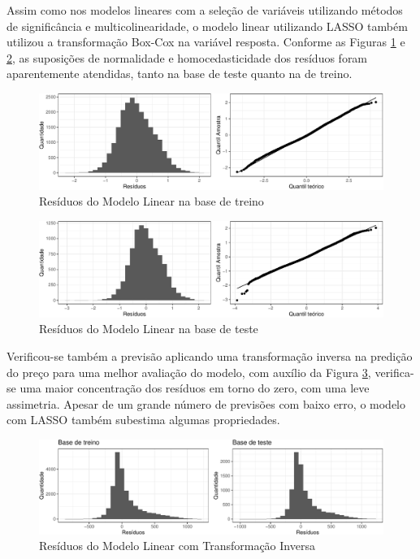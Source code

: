 \documentclass[
	12pt,				%
	a4paper,		%
	oneside,    %
	chapter=TITLE,		   %
	section=TITLE,		   %
	subsection=TITLE,	   %
	subsubsection=TITLE, %
	english,			%
	french,				%
	spanish,			%
	brazil,				%
]{abntex2}
\begin{document}
Assim como nos modelos lineares com a seleção de variáveis utilizando
métodos de significância e multicolinearidade, o modelo linear
utilizando LASSO também utilizou a transformação Box-Cox na variável
resposta. Conforme as Figuras \ref{resid_lasso} e
\ref{resid_lasso_test}, as suposições de normalidade e homocedasticidade
dos resíduos foram aparentemente atendidas, tanto na base de teste
quanto na de treino.

\begin{figure}
\centering
\includegraphics{00-TCC_files/figure-latex/resid_lasso-1.pdf}
\caption{\label{resid_lasso}Resíduos do Modelo Linear na base de treino}
\end{figure}

\begin{figure}
\centering
\includegraphics{00-TCC_files/figure-latex/resid_lasso_test-1.pdf}
\caption{\label{resid_lasso_test}Resíduos do Modelo Linear na base de
teste}
\end{figure}

Verificou-se também a previsão aplicando uma transformação inversa na
predição do preço para uma melhor avaliação do modelo, com auxílio da
Figura \ref{resid_lasso_inv}, verifica-se uma maior concentração dos
resíduos em torno do zero, com uma leve assimetria. Apesar de um grande
número de previsões com baixo erro, o modelo com LASSO também subestima
algumas propriedades.

\begin{figure}
\centering
\includegraphics{00-TCC_files/figure-latex/resid_lasso_inv-1.pdf}
\caption{\label{resid_lasso_inv}Resíduos do Modelo Linear com
Transformação Inversa}
\end{figure}
\end{document}
